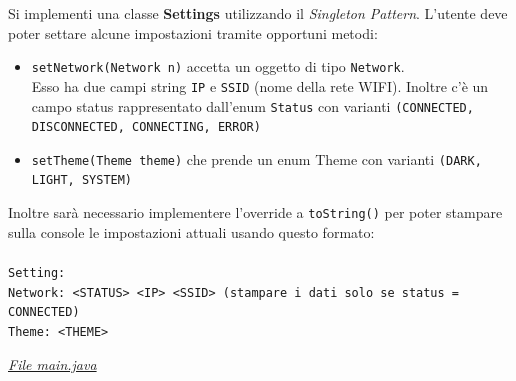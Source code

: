 \documentclass{article}
\begin{document}
Si implementi una classe \textbf{Settings} utilizzando il \textit{Singleton Pattern}.
L'utente deve poter settare alcune impostazioni tramite opportuni metodi:
\begin{itemize}
    \item \texttt{setNetwork(Network n)} accetta un oggetto di tipo \texttt{Network}. \\ Esso ha due campi string \texttt{IP} e \texttt{SSID} (nome della rete WIFI). Inoltre c'è un campo status rappresentato dall'enum \texttt{Status} con varianti \texttt{(CONNECTED, DISCONNECTED, CONNECTING, ERROR)}
    \item \texttt{setTheme(Theme theme)} che prende un enum Theme con varianti \texttt{(DARK, LIGHT, SYSTEM)}
\end{itemize}
Inoltre sarà necessario implementere l'override a \texttt{toString()} per poter stampare sulla console le impostazioni attuali usando questo formato:  \\ \\
\texttt{Setting: \\
Network: <STATUS> <IP> <SSID> (stampare i dati solo se status = CONNECTED) \\
Theme: <THEME>
}

\noindent \href{https://raw.githubusercontent.com/alterax05/Tutorati-P2/refs/heads/main/tutorato%201%2011-03/1TutP2/src/es3_OOP/Main.java}{ \textit{File main.java}}
\end{document}
